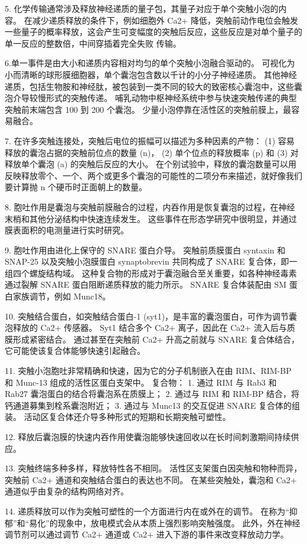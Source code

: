 5. 化学传输通常涉及释放神经递质的量子包，其量子对应于单个突触小泡的内容。 
在减少递质释放的条件下，例如细胞外 Ca2+ 降低，突触前动作电位会触发一些量子的概率释放，这会产生可变幅度的突触后反应，这些反应是对单个量子的单一反应的整数倍，中间穿插着完全失败 传输。 


6.单一事件是由大小和递质内容相对均匀的单个突触小泡融合驱动的。 
可视化为小而清晰的球形膜细胞器，单个囊泡包含数以千计的小分子神经递质。 
其他神经递质，包括生物胺和神经肽，被包装到一类不同的较大的致密核心囊泡中，这些囊泡介导较慢形式的突触传递。 
哺乳动物中枢神经系统中参与快速突触传递的典型突触前末端包含 100 到 200 个囊泡。 
少量小泡停靠在活性区的突触前膜上，最容易融合。


7. 在许多突触连接处，突触后电位的振幅可以描述为多种因素的产物：
(1) 容易释放的囊泡占据的突触前位点的数量 (n)，
(2) 单个位点的释放概率 (p) 和 
(3) 对释放单个囊泡 (a) 的突触后反应的大小。 
在个别试验中，释放的囊泡数量可以用反映释放零个、一个、两个或更多个囊泡的可能性的二项分布来描述，就好像我们要计算抛 n 个硬币时正面朝上的数量。 


8. 胞吐作用是囊泡与突触前膜融合的过程，内吞作用是恢复囊泡的过程，在神经末梢和其他分泌结构中快速连续发生。 
这些事件在形态学研究中很明显，并通过膜表面积的电测量进行实时研究。 


9. 胞吐作用由进化上保守的 SNARE 蛋白介导。 
突触前质膜蛋白 syntaxin 和 SNAP-25 以及突触小泡膜蛋白 synaptobrevin 共同构成了 SNARE 复合体，即一组四个螺旋结构域。 
这种复合物的形成对于囊泡融合至关重要，如各种神经毒素通过裂解 SNARE 蛋白阻断递质释放的能力所示。 
SNARE 复合体装配由 SM 蛋白家族调节，例如 Munc18。 


10. 突触结合蛋白，如突触结合蛋白-1 (syt1)，是丰富的囊泡蛋白，可作为调节囊泡释放的 Ca2+ 传感器。 
Syt1 结合多个 Ca2+ 离子，因此在 Ca2+ 流入后与质膜形成紧密结合。 
通过甚至在突触前 Ca2+ 升高之前就与 SNARE 复合体结合，它可能使该复合体能够快速引起融合。 


11. 突触小泡胞吐非常精确和快速，因为它的分子机制嵌入在由 RIM、RIM-BP 和 Munc-13 组成的活性区蛋白支架中。 
复合物： 1. 通过 RIM 与 Rab3 和 Rab27 囊泡蛋白的结合将囊泡系在质膜上； 2. 通过与 RIM 和 RIM-BP 结合，将钙通道募集到栓系囊泡附近； 3. 通过与 Munc13 的交互促进 SNARE 复合体的组装。 活动区复合体还介导多种形式的短期和长期突触可塑性。 


12. 释放后囊泡膜的快速内吞作用使囊泡能够快速回收以在长时间刺激期间持续供应。 


13. 突触终端多种多样，释放特性各不相同。 
活性区支架蛋白因突触和物种而异，突触前 Ca2+ 通道和突触结合蛋白的表达也不同。 
在某些突触处，囊泡和 Ca2+ 通道似乎由复杂的结构网络对齐。 


14. 递质释放可以作为突触可塑性的一个方面进行内在或外在的调节。 
在称为“抑郁”和“易化”的现象中，放电模式会从本质上强烈影响突触强度。 
此外，外在神经调节剂可以通过调节 Ca2+ 通道或 Ca2+ 进入下游的事件来改变释放动力学。


%

